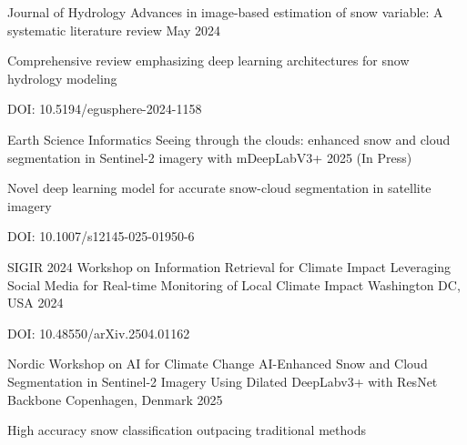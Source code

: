 \documentclass[13pt, a4paper]{awesome-cv}
\begin{document}
\begin{cventries}
  \cventry
    {Journal of Hydrology} %
    {Advances in image-based estimation of snow variable: A systematic literature review} %
    {} %
    {May 2024} %
    {
      \begin{cvitems}
        \item {Comprehensive review emphasizing deep learning architectures for snow hydrology modeling}
        \item {DOI: 10.5194/egusphere-2024-1158}
      \end{cvitems}
    }

  \cventry
    {Earth Science Informatics} %
    {Seeing through the clouds: enhanced snow and cloud segmentation in Sentinel-2 imagery with mDeepLabV3+} %
    {} %
    {2025 (In Press)} %
    {
      \begin{cvitems}
        \item {Novel deep learning model for accurate snow-cloud segmentation in satellite imagery}
        \item {DOI: 10.1007/s12145-025-01950-6}
      \end{cvitems}
    }
\end{cventries}

\begin{cventries}
  \cventry
    {SIGIR 2024 Workshop on Information Retrieval for Climate Impact} %
    {Leveraging Social Media for Real-time Monitoring of Local Climate Impact} %
    {Washington DC, USA} %
    {2024} %
    {
      \begin{cvitems}
        \item {DOI: 10.48550/arXiv.2504.01162}
      \end{cvitems}
    }

  \cventry
    {Nordic Workshop on AI for Climate Change} %
    {AI-Enhanced Snow and Cloud Segmentation in Sentinel-2 Imagery Using Dilated DeepLabv3+ with ResNet Backbone} %
    {Copenhagen, Denmark} %
    {2025} %
    {
      \begin{cvitems}
        \item {High accuracy snow classification outpacing traditional methods}
      \end{cvitems}
    }
\end{cventries}
\end{document}
